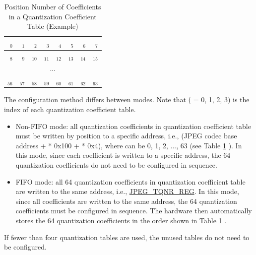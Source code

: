 \documentclass[main\_\_EN.tex]{subfiles}
\begin{document}
\begin{longtable}{ | r | r | r | r | r | r | r | r | }
\caption{Position Number of Coefficients in a Quantization Coefficient Table (Example)} \label{tab:example_qnr}
\\ \hline
 $_{\mathrm{0}}$ & $_{\mathrm{1}}$ & $_{\mathrm{2}}$ & $_{\mathrm{3}}$ & $_{\mathrm{4}}$ & $_{\mathrm{5}}$ & $_{\mathrm{6}}$ & $_{\mathrm{7}}$ \\ \hline
 $_{\mathrm{8}}$ & $_{\mathrm{9}}$ & $_{\mathrm{10}}$ & $_{\mathrm{11}}$ & $_{\mathrm{12}}$ & $_{\mathrm{13}}$ & $_{\mathrm{14}}$ & $_{\mathrm{15}}$ \\ \hline
 \multicolumn{8}{c}{...} \\ \hline
 $_{\mathrm{56}}$ & $_{\mathrm{57}}$ & $_{\mathrm{58}}$ & $_{\mathrm{59}}$ & $_{\mathrm{60}}$ & $_{\mathrm{61}}$ & $_{\mathrm{62}}$ & $_{\mathrm{63}}$ \\ \hline
\end{longtable}

The configuration method differs between modes. Note that  ( = 0, 1, 2, 3) is the index of each quantization coefficient table.
\begin{itemize}
    \item Non-FIFO mode: all quantization coefficients in quantization coefficient table  must be written by position to a specific address, i.e., (JPEG codec base address +  * 0x100 +  * 0x4), where  can be 0, 1, 2, ..., 63 (see Table \ref{tab:example_qnr} \textit{}). In this mode, since each coefficient is written to a specific address, the 64 quantization coefficients do not need to be configured in sequence.
    \item FIFO mode: all 64 quantization coefficients in quantization coefficient table  are written to the same address, i.e., \hyperref[regdesc:JPEGT0QNRREG]{JPEG\_TQNR\_REG}. In this mode, since all coefficients are written to the same address, the 64 quantization coefficients must be configured in sequence. The hardware then automatically stores the 64 quantization coefficients in the order shown in Table \ref{tab:example_qnr} \textit{}.
\end{itemize}

If fewer than four quantization tables are used, the unused tables do not need to be configured.
\end{document}

